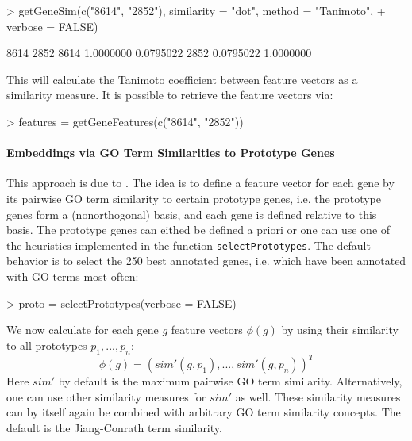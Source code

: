\documentclass[12pt,a4paper]{article}
\begin{document}
\begin{Schunk}
\begin{Sinput}
> getGeneSim(c("8614", "2852"), similarity = "dot", method = "Tanimoto", 
+     verbose = FALSE)
\end{Sinput}
\begin{Soutput}
          8614      2852
8614 1.0000000 0.0795022
2852 0.0795022 1.0000000
\end{Soutput}
\end{Schunk}
This will calculate the Tanimoto coefficient between feature vectors as a similarity measure. It is possible to retrieve the feature vectors via:
\begin{Schunk}
\begin{Sinput}
> features = getGeneFeatures(c("8614", "2852"))
\end{Sinput}
\end{Schunk}


\paragraph{Embeddings via GO Term Similarities to Prototype Genes}

This approach is due to \cite{FroeGO05,FroeSpeerGOKer06}. The idea is to define a feature vector for each gene by its pairwise GO term similarity to certain prototype genes, i.e. the prototype genes form a (nonorthogonal) basis, and each gene is defined relative to this basis. The prototype genes can eithed be defined a priori or one can use one of the heuristics implemented in the function {\tt selectPrototypes}. The default behavior is to select the 250 best annotated genes, i.e. which have been annotated with GO terms most often:
\begin{Schunk}
\begin{Sinput}
> proto = selectPrototypes(verbose = FALSE)
\end{Sinput}
\end{Schunk}

We now calculate for each gene $g$ feature vectors $\phi(g)$  by using their similarity to all prototypes $p_1,...,p_n$:
\begin{equation}
\phi(g) = (sim'(g,p_1),...,sim'(g,p_n))^T
\end{equation}
Here $sim'$ by default is the maximum pairwise GO term similarity. Alternatively, one can use other similarity measures for $sim'$ as well. These similarity measures can by itself again be combined with arbitrary GO term similarity concepts. The default is the Jiang-Conrath term similarity.
\end{document}
